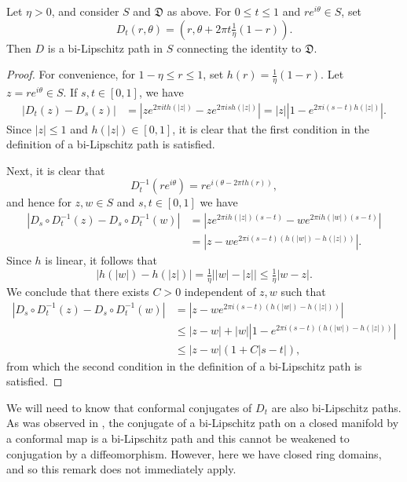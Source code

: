 \documentclass{amsart}
\begin{document}
\begin{lemma}
\label{lem:dehntwistpath}
Let $\eta >0$, and consider $S$ and $\mathfrak{D}$ as above.
For $0\leq t\leq 1$ and $re^{i\theta} \in S$, set 
\[ D_t(r,\theta) = \left ( r , \theta + 2\pi t \tfrac1{\eta}(1-r) \right ).\]
Then $D$ is a bi-Lipschitz path in $S$ connecting the identity to $\mathfrak{D}$.
\end{lemma}

\begin{proof}
For convenience, for $1-\eta \leq r \leq 1$, set $h(r) =  \frac1{\eta}(1-r)$. Let $z = re^{i\theta} \in S$. If $s,t \in [0,1]$, we have
\begin{align*} 
|D_t(z) - D_s(z) | &= |ze^{2\pi i t h(|z|)} - ze^{2\pi i s h(|z|)}| = |z| \left | 1 - e^{2\pi i (s-t) h(|z|) } \right |.
\end{align*}
Since $|z| \leq 1$ and $h(|z|) \in [0,1]$, it is clear that the first condition in the definition of a bi-Lipschitz path is satisfied.

Next, it is clear that 
\[ D_t^{-1} ( re^{i\theta} ) = re^{ i ( \theta - 2\pi t h(r) ) },\]
and hence for $z,w\in S$ and $s,t \in [0,1]$ we have
\begin{align*}
| D_s \circ D_t^{-1} (z) - D_s \circ D_t^{-1} (w) |  &= | ze^{2\pi i h(|z|) (s-t)} - we^{2\pi i h(|w|) (s-t) }| \\
&= |z-we^{ 2\pi i (s-t)(h(|w|) - h(|z|) ) }|.
\end{align*}
Since $h$ is linear, it follows that
\[ | h(|w|) - h(|z|) |  = \tfrac1{\eta} \left | |w| - |z| \right| \leq \tfrac1{\eta}|w-z|.\]
We conclude that there exists $C>0$ independent of $z,w$ such that
\begin{align*} 
| D_s \circ D_t^{-1} (z) - D_s \circ D_t^{-1} (w) | &= |z-we^{ 2\pi i (s-t)(h(|w|) - h(|z|) ) }| \\
&\leq |z-w| + |w| \left | 1 - e^{ 2\pi i (s-t)(h(|w|) - h(|z|) ) } \right | \\
&\leq |z-w| ( 1+C|s-t| ),
\end{align*}
from which the second condition in the definition of a bi-Lipschitz path is satisfied.
\end{proof}

We will need to know that conformal conjugates of $D_t$ are also bi-Lipschitz paths. As was observed in \cite[Remark 2.6]{FM}, the conjugate of a bi-Lipschitz path on a closed manifold by a conformal map is a bi-Lipschitz path and this cannot be weakened to conjugation by a diffeomorphism. However, here we have closed ring domains, and so this remark does not immediately apply.
\end{document}
